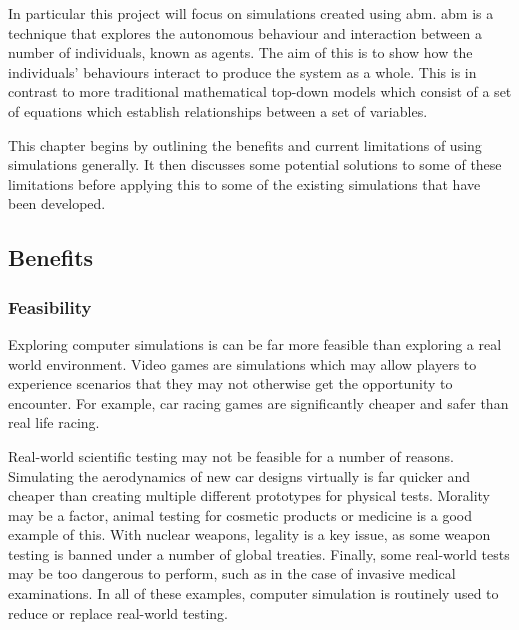 \documentclass{UoYCSproject}
\begin{document}

In particular this project will focus on simulations created using \gls{abm}.
\gls{abm} is a technique that explores the autonomous behaviour and interaction between a number of individuals, known as agents.
The aim of this is to show how the individuals' behaviours interact to produce the system as a whole.
This is in contrast to more traditional mathematical top-down models which consist of a set of equations which establish relationships between a set of variables.

This chapter begins by outlining the benefits and current limitations of using simulations generally.
It then discusses some potential solutions to some of these limitations before applying this to some of the existing simulations that have been developed.

\subsection{Benefits}
\subsubsection{Feasibility}
Exploring computer simulations is can be far more feasible than exploring a real world environment.
Video games are simulations which may allow players to experience scenarios that they may not otherwise get the opportunity to encounter.
For example, car racing games are significantly cheaper and safer than real life racing.

Real-world scientific testing may not be feasible for a number of reasons.
Simulating the aerodynamics of new car designs virtually is far quicker and cheaper than creating multiple different prototypes for physical tests.
Morality may be a factor, animal testing for cosmetic products or medicine is a good example of this. With nuclear weapons, legality is a key issue, as some weapon testing is banned under a number of global treaties\cite{partial_nuclear_test_ban_treaty, threshold_test_ban_treaty}.
Finally, some real-world tests may be too dangerous to perform, such as in the case of invasive medical examinations.
In all of these examples, computer simulation is routinely used to reduce or replace real-world testing.
\end{document}
